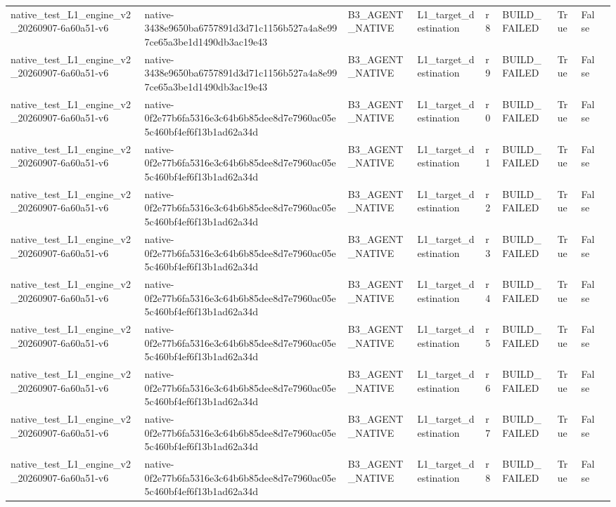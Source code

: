 \begin{tabular}{lllllllll}
native\_test\_L1\_engine\_v2\_20260907-6a60a51-v6 & native-3438e9650ba6757891d3d71c1156b527a4a8e997ce65a3be1d1490db3ac19e43 & B3\_AGENT\_NATIVE & L1\_target\_destination & r8 & BUILD\_FAILED & True & False &  \\
native\_test\_L1\_engine\_v2\_20260907-6a60a51-v6 & native-3438e9650ba6757891d3d71c1156b527a4a8e997ce65a3be1d1490db3ac19e43 & B3\_AGENT\_NATIVE & L1\_target\_destination & r9 & BUILD\_FAILED & True & False &  \\
native\_test\_L1\_engine\_v2\_20260907-6a60a51-v6 & native-0f2e77b6fa5316e3c64b6b85dee8d7e7960ac05e5c460bf4ef6f13b1ad62a34d & B3\_AGENT\_NATIVE & L1\_target\_destination & r0 & BUILD\_FAILED & True & False &  \\
native\_test\_L1\_engine\_v2\_20260907-6a60a51-v6 & native-0f2e77b6fa5316e3c64b6b85dee8d7e7960ac05e5c460bf4ef6f13b1ad62a34d & B3\_AGENT\_NATIVE & L1\_target\_destination & r1 & BUILD\_FAILED & True & False &  \\
native\_test\_L1\_engine\_v2\_20260907-6a60a51-v6 & native-0f2e77b6fa5316e3c64b6b85dee8d7e7960ac05e5c460bf4ef6f13b1ad62a34d & B3\_AGENT\_NATIVE & L1\_target\_destination & r2 & BUILD\_FAILED & True & False &  \\
native\_test\_L1\_engine\_v2\_20260907-6a60a51-v6 & native-0f2e77b6fa5316e3c64b6b85dee8d7e7960ac05e5c460bf4ef6f13b1ad62a34d & B3\_AGENT\_NATIVE & L1\_target\_destination & r3 & BUILD\_FAILED & True & False &  \\
native\_test\_L1\_engine\_v2\_20260907-6a60a51-v6 & native-0f2e77b6fa5316e3c64b6b85dee8d7e7960ac05e5c460bf4ef6f13b1ad62a34d & B3\_AGENT\_NATIVE & L1\_target\_destination & r4 & BUILD\_FAILED & True & False &  \\
native\_test\_L1\_engine\_v2\_20260907-6a60a51-v6 & native-0f2e77b6fa5316e3c64b6b85dee8d7e7960ac05e5c460bf4ef6f13b1ad62a34d & B3\_AGENT\_NATIVE & L1\_target\_destination & r5 & BUILD\_FAILED & True & False &  \\
native\_test\_L1\_engine\_v2\_20260907-6a60a51-v6 & native-0f2e77b6fa5316e3c64b6b85dee8d7e7960ac05e5c460bf4ef6f13b1ad62a34d & B3\_AGENT\_NATIVE & L1\_target\_destination & r6 & BUILD\_FAILED & True & False &  \\
native\_test\_L1\_engine\_v2\_20260907-6a60a51-v6 & native-0f2e77b6fa5316e3c64b6b85dee8d7e7960ac05e5c460bf4ef6f13b1ad62a34d & B3\_AGENT\_NATIVE & L1\_target\_destination & r7 & BUILD\_FAILED & True & False &  \\
native\_test\_L1\_engine\_v2\_20260907-6a60a51-v6 & native-0f2e77b6fa5316e3c64b6b85dee8d7e7960ac05e5c460bf4ef6f13b1ad62a34d & B3\_AGENT\_NATIVE & L1\_target\_destination & r8 & BUILD\_FAILED & True & False &  \\

\end{tabular}
